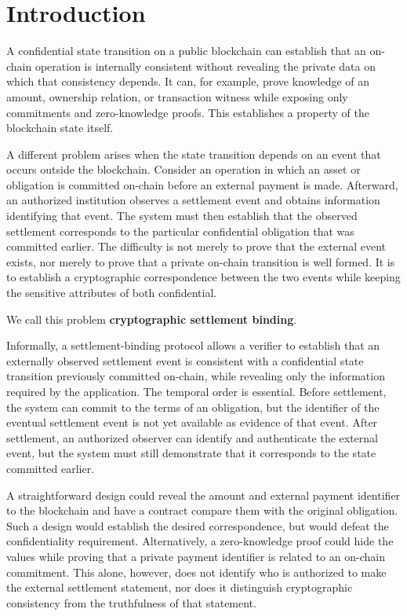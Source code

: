 \documentclass[10pt,twocolumn]{article}
\begin{document}
\section{Introduction}

A confidential state transition on a public blockchain can establish that
an on-chain operation is internally consistent without revealing the
private data on which that consistency depends. It can, for example,
prove knowledge of an amount, ownership relation, or transaction witness
while exposing only commitments and zero-knowledge proofs. This
establishes a property of the blockchain state itself.

A different problem arises when the state transition depends on an event
that occurs outside the blockchain. Consider an operation in which an
asset or obligation is committed on-chain before an external payment is
made. Afterward, an authorized institution observes a settlement event
and obtains information identifying that event. The system must then
establish that the observed settlement corresponds to the particular
confidential obligation that was committed earlier. The difficulty is not
merely to prove that the external event exists, nor merely to prove that
a private on-chain transition is well formed. It is to establish a
cryptographic correspondence between the two events while keeping the
sensitive attributes of both confidential.

We call this problem \textbf{cryptographic settlement binding}.

Informally, a settlement-binding protocol allows a verifier to establish
that an externally observed settlement event is consistent with a
confidential state transition previously committed on-chain, while
revealing only the information required by the application. The temporal
order is essential. Before settlement, the system can commit to the terms
of an obligation, but the identifier of the eventual settlement event is
not yet available as evidence of that event. After settlement, an
authorized observer can identify and authenticate the external event, but
the system must still demonstrate that it corresponds to the state
committed earlier.

A straightforward design could reveal the amount and external payment
identifier to the blockchain and have a contract compare them with the
original obligation. Such a design would establish the desired
correspondence, but would defeat the confidentiality requirement.
Alternatively, a zero-knowledge proof could hide the values while proving
that a private payment identifier is related to an on-chain commitment.
This alone, however, does not identify who is authorized to make the
external settlement statement, nor does it distinguish cryptographic
consistency from the truthfulness of that statement.
\end{document}
